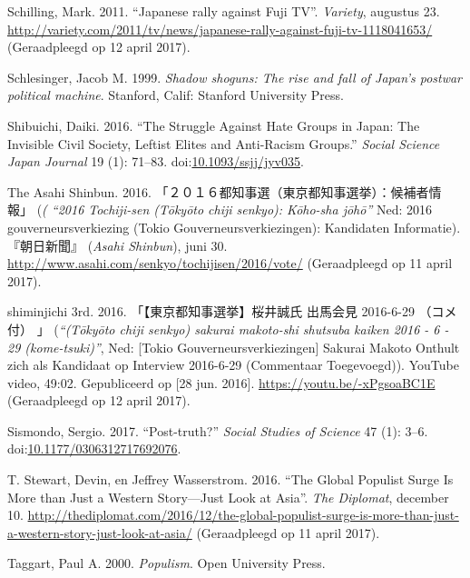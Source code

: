 \documentclass[10.5pt,dutch,]{article}
\begin{document}
\hypertarget{ref-schillingux5fjapaneseux5f2011}{}
Schilling, Mark. 2011. “Japanese rally against Fuji TV”. \emph{Variety}, augustus 23. \url{http://variety.com/2011/tv/news/japanese-rally-against-fuji-tv-1118041653/} (Geraadpleegd op 12 april 2017).

\hypertarget{ref-schlesingerux5fshadowux5f1999}{}
Schlesinger, Jacob M. 1999. \emph{Shadow shoguns: The rise and fall of
Japan's postwar political machine}. Stanford, Calif: Stanford University
Press.

\hypertarget{ref-shibuichiux5fstruggleux5f2016}{}
Shibuichi, Daiki. 2016. “The Struggle Against Hate Groups in Japan: The
Invisible Civil Society, Leftist Elites and Anti-Racism Groups.”
\emph{Social Science Japan Journal} 19 (1): 71--83.
doi:\href{https://doi.org/10.1093/ssjj/jyv035}{10.1093/ssjj/jyv035}.

\hypertarget{ref-asahiux5fshimbunux5felectionsux5f2016}{}
The Asahi Shinbun. 2016. 「２０１６都知事選（東京都知事選挙）：候補者情報」 (\emph{( “2016 Tochiji-sen (Tōkyōto chiji senkyo): Kōho-sha jōhō”} Ned: 2016 gouverneursverkiezing (Tokio Gouverneursverkiezingen): Kandidaten Informatie). 『朝日新聞』 (\emph{Asahi Shinbun}), juni 30. \url{http://www.asahi.com/senkyo/tochijisen/2016/vote/} (Geraadpleegd op 11 april 2017).

\hypertarget{ref-shiminjichiux5f3rdux5ftokyochijiux5f2016}{}
shiminjichi 3rd. 2016. 「【東京都知事選挙】桜井誠氏 出馬会見 2016-6-29 （コメ付） 」 (\emph{“(Tōkyōto chiji senkyo) sakurai makoto-shi shutsuba kaiken 2016 - 6 - 29 (kome-tsuki)”}, Ned: [Tokio Gouverneursverkiezingen] Sakurai Makoto Onthult zich als Kandidaat op Interview 2016-6-29 (Commentaar Toegevoegd)). YouTube video, 49:02. Gepubliceerd op [28 jun. 2016]. \url{https://youtu.be/-xPgsoaBC1E} (Geraadpleegd op 12 april 2017).

\hypertarget{ref-sismondoux5fpost-truthux3fux5f2017}{}
Sismondo, Sergio. 2017. “Post-truth?” \emph{Social Studies of Science} 47
(1): 3--6.
doi:\href{https://doi.org/10.1177/0306312717692076}{10.1177/0306312717692076}.

\hypertarget{ref-t.ux5fstewartux5fglobalux5f2016}{}
T. Stewart, Devin, en Jeffrey Wasserstrom. 2016. “The Global Populist Surge Is More than Just a Western Story—Just Look at Asia”. \emph{The Diplomat}, december 10. \url{http://thediplomat.com/2016/12/the-global-populist-surge-is-more-than-just-a-western-story-just-look-at-asia/} (Geraadpleegd op 11 april 2017).

\hypertarget{ref-taggartux5fpopulismux5f2000}{}
Taggart, Paul A. 2000. \emph{Populism}. Open University Press.
\end{document}
